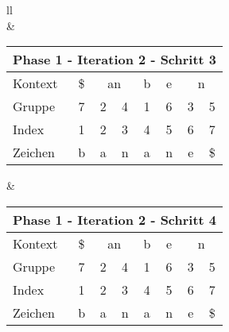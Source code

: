 \begin{table}[H]
\begin{adjustbox}{max width=\textwidth}
\begin{tabular}{ll}
\\
&
\\

\begin{tabular}{lccccccc}
\multicolumn{8}{l}{Phase 1 - Iteration 2 - Schritt 3}                                                                                                                                             \\ \hline
\multicolumn{1}{l|}{Kontext} & \multicolumn{1}{c|}{\$} & \multicolumn{2}{c|}{an}    & \multicolumn{1}{c|}{b}    & \multicolumn{1}{c|}{\cellcolor[HTML]{\green}e} & \multicolumn{2}{c}{n}         \\
\multicolumn{1}{l|}{Gruppe}  & \multicolumn{1}{c|}{7}  & 2 & \multicolumn{1}{c|}{4} & \multicolumn{1}{c|}{1}    & \multicolumn{1}{c|}{\cellcolor[HTML]{\green}6} & 3                         & 5  \\ \hline
\multicolumn{1}{l|}{Index}   & 1                       & 2 & 3                      & \cellcolor[HTML]{\red}4 & \cellcolor[HTML]{\red}5                      & \cellcolor[HTML]{\green}6 & 7  \\
\multicolumn{1}{l|}{Zeichen} & b                       & a & n                      & \cellcolor[HTML]{\red}a & \cellcolor[HTML]{\red}n                      & \cellcolor[HTML]{\green}e & \$
\end{tabular}

&

\begin{tabular}{lccccccc}
\multicolumn{8}{l}{Phase 1 - Iteration 2 - Schritt 4}                                                                                                                                                                     \\ \hline
\multicolumn{1}{l|}{Kontext} & \multicolumn{1}{c|}{\$} & \multicolumn{2}{c|}{\cellcolor[HTML]{\red}an}    & \multicolumn{1}{c|}{b}    & \multicolumn{1}{c|}{\cellcolor[HTML]{\green}e} & \multicolumn{2}{c}{n}         \\
\multicolumn{1}{l|}{Gruppe}  & \multicolumn{1}{c|}{7}  & 2 & \multicolumn{1}{c|}{\cellcolor[HTML]{\red}4} & \multicolumn{1}{c|}{1}    & \multicolumn{1}{c|}{\cellcolor[HTML]{\green}6} & 3                         & 5  \\ \hline
\multicolumn{1}{l|}{Index}   & 1                       & 2 & 3                                              & \cellcolor[HTML]{\red}4 & \cellcolor[HTML]{\red}5                      & \cellcolor[HTML]{\green}6 & 7  \\
\multicolumn{1}{l|}{Zeichen} & b                       & a & n                                              & \cellcolor[HTML]{\red}a & \cellcolor[HTML]{\red}n                      & \cellcolor[HTML]{\green}e & \$
\end{tabular}


\end{tabular}
\end{adjustbox}
\end{table}
